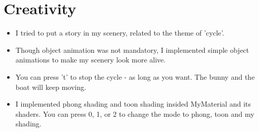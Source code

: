 \documentclass[10pt,a4paper]{article}
\begin{document}
	\section{Creativity}	
	\begin{itemize}
		\item I tried to put a story in my scenery, related to the theme of 'cycle'.
		
		\item Though object animation was not mandatory, I implemented simple object animations to make my scenery look more alive.
		
		\item You can press 't' to stop the cycle - as long as you want. The bunny and the boat will keep moving.
		
		\item I implemented phong shading and toon shading insided MyMaterial and its shaders. You can press 0, 1, or 2 to change the mode to phong, toon and my shading.
	\end{itemize} 
\end{document}
